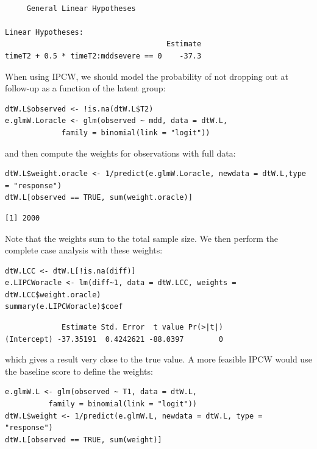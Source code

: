 \documentclass[12pt]{article}
\begin{document}
\begin{verbatim}

	 General Linear Hypotheses

Linear Hypotheses:
                                     Estimate
timeT2 + 0.5 * timeT2:mddsevere == 0    -37.3
\end{verbatim}


\bigskip

 When using IPCW, we should model the probability of not dropping out
at follow-up as a function of the latent group:
\lstset{language=r,label= ,caption= ,captionpos=b,numbers=none}
\begin{lstlisting}
dtW.L$observed <- !is.na(dtW.L$T2)
e.glmW.Loracle <- glm(observed ~ mdd, data = dtW.L,
		     family = binomial(link = "logit"))
\end{lstlisting}

and then compute the weights for observations with full data:
\lstset{language=r,label= ,caption= ,captionpos=b,numbers=none}
\begin{lstlisting}
dtW.L$weight.oracle <- 1/predict(e.glmW.Loracle, newdata = dtW.L,type = "response")
dtW.L[observed == TRUE, sum(weight.oracle)]
\end{lstlisting}

\begin{verbatim}
[1] 2000
\end{verbatim}


Note that the weights sum to the total sample size. We then perform
the complete case analysis with these weights:
\lstset{language=r,label= ,caption= ,captionpos=b,numbers=none}
\begin{lstlisting}
dtW.LCC <- dtW.L[!is.na(diff)]
e.LIPCWoracle <- lm(diff~1, data = dtW.LCC, weights = dtW.LCC$weight.oracle)
summary(e.LIPCWoracle)$coef
\end{lstlisting}

\begin{verbatim}
             Estimate Std. Error  t value Pr(>|t|)
(Intercept) -37.35191  0.4242621 -88.0397        0
\end{verbatim}


which gives a result very close to the true value. A more feasible
IPCW would use the baseline score to define the weights:
\lstset{language=r,label= ,caption= ,captionpos=b,numbers=none}
\begin{lstlisting}
e.glmW.L <- glm(observed ~ T1, data = dtW.L,
	      family = binomial(link = "logit"))
dtW.L$weight <- 1/predict(e.glmW.L, newdata = dtW.L, type = "response")
dtW.L[observed == TRUE, sum(weight)]
\end{lstlisting}
\end{document}
